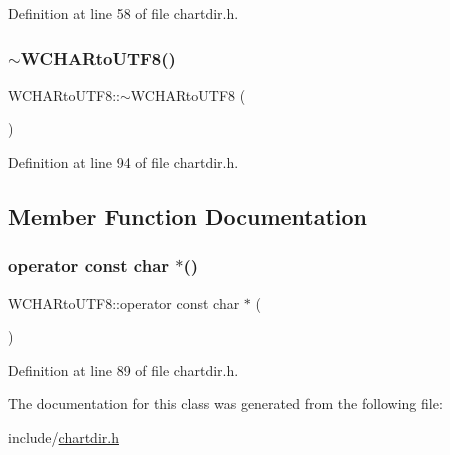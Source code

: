 Definition at line 58 of file chartdir.\+h.

\mbox{\label{class_w_c_h_a_rto_u_t_f8_a030e6ed95f93a6be5d9083e95f8f3f1d}} 
\subsubsection{\texorpdfstring{$\sim$\+W\+C\+H\+A\+Rto\+U\+T\+F8()}{~WCHARtoUTF8()}}
{\footnotesize\ttfamily W\+C\+H\+A\+Rto\+U\+T\+F8\+::$\sim$\+W\+C\+H\+A\+Rto\+U\+T\+F8 (\begin{DoxyParamCaption}{ }\end{DoxyParamCaption})\hspace{0.3cm}{\ttfamily [inline]}}



Definition at line 94 of file chartdir.\+h.



\subsection{Member Function Documentation}
\mbox{\label{class_w_c_h_a_rto_u_t_f8_a98eaf37924edf3c9b05e6b8eba2b4e8b}} 
\subsubsection{\texorpdfstring{operator const char $\ast$()}{operator const char *()}}
{\footnotesize\ttfamily W\+C\+H\+A\+Rto\+U\+T\+F8\+::operator const char $\ast$ (\begin{DoxyParamCaption}{ }\end{DoxyParamCaption})\hspace{0.3cm}{\ttfamily [inline]}}



Definition at line 89 of file chartdir.\+h.



The documentation for this class was generated from the following file\+:\begin{DoxyCompactItemize}
\item 
include/\hyperlink{chartdir_8h}{chartdir.\+h}\end{DoxyCompactItemize}
